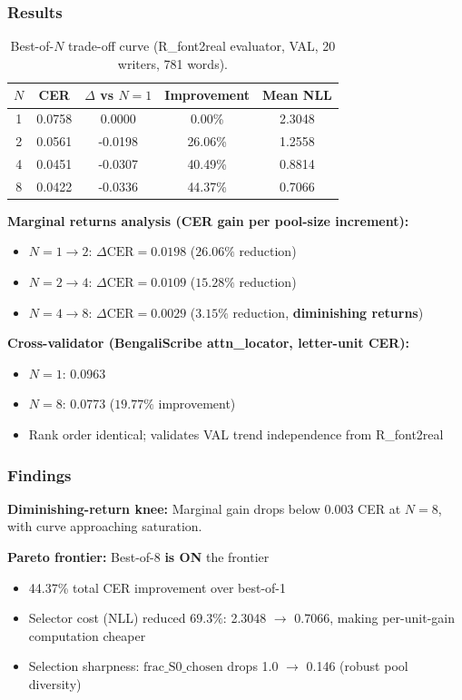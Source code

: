 \documentclass[10.5pt,a4paper]{article}
\begin{document}
\subsubsection{Results}

\begin{table}[h]
\centering
\caption{Best-of-$N$ trade-off curve (R\_font2real evaluator, VAL, 20 writers, 781 words).}
\begin{tabular}{|c|c|c|c|c|}
\hline
$N$ & CER & $\Delta$ vs $N{=}1$ & Improvement & Mean NLL \\
\hline
1 & 0.0758 & 0.0000 & 0.00\% & 2.3048 \\
2 & 0.0561 & -0.0198 & 26.06\% & 1.2558 \\
4 & 0.0451 & -0.0307 & 40.49\% & 0.8814 \\
8 & 0.0422 & -0.0336 & 44.37\% & 0.7066 \\
\hline
\end{tabular}
\end{table}

\textbf{Marginal returns analysis (CER gain per pool-size increment):}
\begin{itemize}
    \item $N{=}1 \to 2$: $\Delta\text{CER} = 0.0198$ ($26.06\%$ reduction)
    \item $N{=}2 \to 4$: $\Delta\text{CER} = 0.0109$ ($15.28\%$ reduction)
    \item $N{=}4 \to 8$: $\Delta\text{CER} = 0.0029$ ($3.15\%$ reduction, \textbf{diminishing returns})
\end{itemize}

\textbf{Cross-validator (BengaliScribe attn\_locator, letter-unit CER):}
\begin{itemize}
    \item $N{=}1$: 0.0963
    \item $N{=}8$: 0.0773 ($19.77\%$ improvement)
    \item Rank order identical; validates VAL trend independence from R\_font2real
\end{itemize}

\subsubsection{Findings}

\textbf{Diminishing-return knee:} Marginal gain drops below 0.003 CER at $N{=}8$, with curve approaching saturation.

\textbf{Pareto frontier:} Best-of-8 \textbf{is ON} the frontier
\begin{itemize}
    \item 44.37\% total CER improvement over best-of-1
    \item Selector cost (NLL) reduced $69.3\%$: 2.3048 $\to$ 0.7066, making per-unit-gain computation cheaper
    \item Selection sharpness: $\text{frac\_S0\_chosen}$ drops 1.0 $\to$ 0.146 (robust pool diversity)
\end{itemize}
\end{document}
